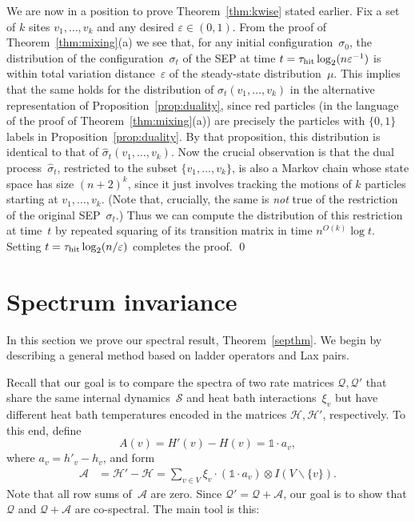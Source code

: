 \documentclass[11pt]{article}
\theoremstyle{plain}
\theoremstyle{definition}
\theoremstyle{remark}
\numberwithin{equation}{section}
\newcommand{\cA}{{\mathcal A}}
\newcommand{\cH}{{\mathcal H}}
\newcommand{\cS}{{\mathcal S}}
\newcommand{\be}{\begin{equation}}
\newcommand{\ee}{\end{equation}}
\newcommand{\one}{\mathbb{1}}
\renewcommand{\cS}{{\mathcal Q}}
\newcommand{\cSin}{{\mathcal S}}
\newcommand{\hit}{\tau_{\rm hit}}
\newenvironment{proofof}[1]{{\par\bigskip\noindent \em Proof of #1.}\/}{\hfill\qed\bigskip}
\begin{document}
We are now in a position to prove Theorem~\ref{thm:kwise} stated earlier.
\begin{proofof}{Theorem~\ref{thm:kwise}}
Fix a set of $k$ sites $v_1,\ldots,v_k$ and any desired $\varepsilon\in(0,1)$.  
From the proof of Theorem~\ref{thm:mixing}(a) 
we see that, for any initial configuration~$\sigma_0$, the distribution of the configuration~$\sigma_t$
of the SEP at time $t=\hit\log_2(n\varepsilon^{-1})$ is within total variation distance~$\varepsilon$ of
the steady-state distribution~$\mu$.  This implies that the same holds for the distribution
of $\sigma_t(v_1,\ldots,v_k)$ in the alternative representation of Proposition~\ref{prop:duality},
since red particles (in the language of the proof of Theorem~\ref{thm:mixing}(a)) are precisely
the particles with $\{0,1\}$ labels in Proposition~\ref{prop:duality}.
By that proposition, this distribution is identical to that of $\hat\sigma_t(v_1,\ldots,v_k)$.
Now the crucial observation is that the dual process~$\hat\sigma_t$, restricted to
the subset $\{v_1,\ldots,v_k\}$, is also a Markov chain whose state space has size $(n+2)^k$,
since it just involves tracking the motions of $k$ particles starting at $v_1,\ldots,v_k$.
(Note that, crucially, the same is {\it not\/} true of the restriction of the original SEP~$\sigma_t$.)
Thus we can compute the distribution of this restriction at time~$t$ by repeated squaring
of its transition matrix in time $n^{O(k)}\log t$.  Setting $t=\hit\log_2(n/\varepsilon)$
completes the proof.
\end{proofof}

\section{Spectrum invariance}\label{sec:spectral}
In this section we prove our spectral result, Theorem~\ref{septhm}.
We begin by describing a general method based on ladder operators and Lax pairs.

Recall that our goal is to compare the spectra of two rate matrices $\cS,\cS'$ that share the
same internal dynamics~$\cSin$ and heat bath interactions~$\xi_v$
but have different heat bath temperatures encoded in the matrices $\cH,\cH'$, respectively.
To this end, define \be A(v)=H'(v)-H(v) = \one \cdot a_v, \label{avmless} \ee
where $a_v=h'_v-h_v$, and form
\begin{align} 
\cA &= \cH' - \cH
= \sum_{v \in V} \xi_{v} \cdot (\one \cdot a_v) \otimes I(V\backslash \{v\}).
 \label{A} \end{align}
Note that all row sums of~$\cA$ are zero.
Since $\cS' = \cS+\cA$, our goal is to show that $\cS$ and $\cS+\cA$ are co-spectral. 
The main tool is this:
\end{document}
